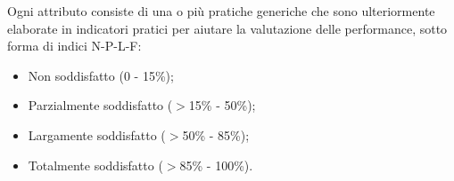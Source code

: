 \documentclass[PianoDiQualifica.tex]{subfiles}
\begin{document}
Ogni attributo consiste di una o più pratiche generiche che sono ulteriormente elaborate in indicatori pratici per aiutare la valutazione delle performance, sotto forma di indici N-P-L-F:
\begin{itemize}
	\item Non soddisfatto (0 - 15\%);
	\item Parzialmente soddisfatto ($ > $15\% - 50\%);
	\item Largamente soddisfatto ($ > $50\% - 85\%);
	\item Totalmente soddisfatto ($ > $85\% - 100\%).
\end{itemize}
\end{document}
